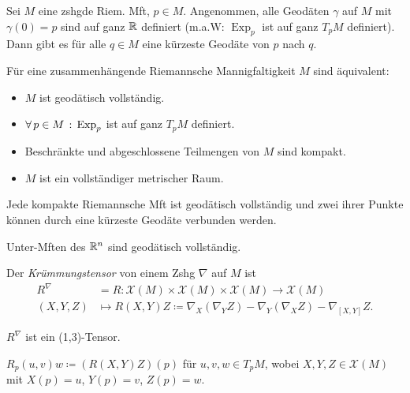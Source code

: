 \documentclass{cheat-sheet}
\DeclareMathOperator{\Exp}{Exp} %
\newcommand{\VF}{\mathcal{X}} %
\begin{document}

\begin{satz}
  Sei $M$ eine zshgde Riem. Mft, $p \in M$. Angenommen, alle Geodäten $\gamma$ auf $M$ mit $\gamma(0) = p$ sind auf ganz $\mathbb{R}$ definiert (m.a.W: $\Exp_p$ ist auf ganz $T_p M$ definiert). Dann gibt es für alle $q \in M$ eine kürzeste Geodäte von $p$ nach $q$.
\end{satz}

\begin{satz}
  Für eine zusammenhängende Riemannsche Mannigfaltigkeit $M$ sind äquivalent:
  \begin{itemize}
    \item $M$ ist geodätisch vollständig.
    \item $\fa{p \in M} \Exp_p$ ist auf ganz $T_p M$ definiert.
    \item Beschränkte und abgeschlossene Teilmengen von $M$ sind kompakt.
    \item $M$ ist ein vollständiger metrischer Raum.
  \end{itemize}
\end{satz}

\begin{kor}
  Jede kompakte Riemannsche Mft ist geodätisch vollständig und zwei ihrer Punkte können durch eine kürzeste Geodäte verbunden werden.
\end{kor}

\begin{kor}
  Unter-Mften des $\mathbb{R}^n$ sind geodätisch vollständig.
\end{kor}


\begin{defn}
  Der \emph{Krümmungstensor} von einem Zshg $\nabla$ auf $M$ ist
  \begin{align*}
    R^{\nabla} & = R : \VF(M) \times \VF(M) \times \VF(M) \to \VF(M) \\
    (X, Y, Z) & \mapsto R(X, Y)Z \coloneqq \nabla_X (\nabla_Y Z) - \nabla_Y (\nabla_X Z) - \nabla_{[X, Y]} Z.
  \end{align*}
\end{defn}

\begin{bem}
  $R^\nabla$ ist ein (1,3)-Tensor.
\end{bem}

\begin{nota}
  $R_p(u, v)w \coloneqq (R(X, Y)Z)(p)$ für $u, v, w \in T_p M$, wobei $X, Y, Z \in \VF(M)$ mit $X(p) \!=\! u$, $Y(p) \!=\! v$, $Z(p) \!=\! w$.
\end{nota}
\end{document}
